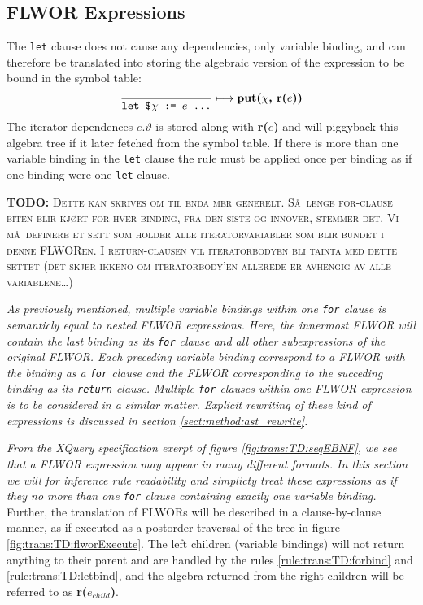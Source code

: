 \subsection{FLWOR Expressions}
\label{sect:trans:TD:simpleFLWOR}
The \texttt{let} clause does not cause any dependencies, only variable binding, and can therefore be translated
into storing the algebraic version of the expression to be bound in the symbol table:
\begin{equation}
\frac{}{\mbox{\texttt{let \$}}\chi \mbox{\texttt{ := }}e \mbox{\texttt{ \ldots}}}\longmapsto
\mbox{\textbf{put(}}\chi\mbox{\textbf{, r(}}e\mbox{\textbf{))}}
\label{rule:trans:TD:letbind}
\end{equation}
The iterator dependences $e.\vartheta$ is stored along with \textbf{r(}$e$\textbf{)} and will piggyback this
algebra tree if it later fetched from the symbol table. If there is more than one variable binding in the
\texttt{let} clause the rule must be applied once per binding as if one binding were one \texttt{let} clause.

\textbf{\Large TODO:} \textsc{Dette kan skrives om til enda mer generelt. S\aa~lenge for-clause biten blir kj\o rt
for hver binding, fra den siste og innover, stemmer det. Vi m\aa~definere et sett som holder alle iteratorvariabler
som blir bundet i denne FLWORen. I return-clausen vil iteratorbodyen bli tainta med dette settet (det skjer ikkeno
om iteratorbody'en allerede er avhengig av alle variablene\ldots)}

\textit{As previously mentioned, multiple variable bindings within one \texttt{for} clause is semanticly equal
to nested FLWOR expressions. Here, the innermost FLWOR will contain the last binding as its \texttt{for} clause and
all other subexpressions of the original FLWOR. Each preceding variable binding correspond to a FLWOR with the
binding as a \texttt{for} clause and the FLWOR corresponding to the succeding binding as its \texttt{return}
clause. Multiple \texttt{for} clauses within one FLWOR expression is to be considered in a similar matter.
Explicit rewriting of these kind of expressions is discussed in section \ref{sect:method:ast_rewrite}.}

\textit{
From the XQuery specification exerpt of figure \ref{fig:trans:TD:seqEBNF}, we see that a FLWOR expression may
appear in many different formats. In this section we will for inference rule readability and simplicty treat these
expressions as if they no more than \emph{one} \texttt{for} clause containing exactly \emph{one} variable binding.}
Further, the translation of FLWORs will be described in a clause-by-clause manner, as if executed as a postorder
traversal of the tree in figure \ref{fig:trans:TD:flworExecute}. The left children (variable bindings) will not
return anything to their parent and are handled by the rules \ref{rule:trans:TD:forbind} and
\ref{rule:trans:TD:letbind}, and the algebra returned from the right children will be referred to as
\textbf{r(}$e_{child}$\textbf{)}.

